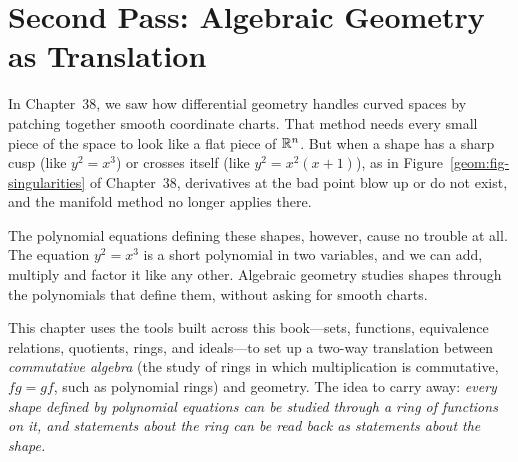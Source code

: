 \section{Second Pass: Algebraic Geometry as Translation}
\chapterline

In Chapter~38, we saw how differential geometry handles curved spaces by patching together smooth coordinate charts. That method needs every small piece of the space to look like a flat piece of $\mathbb{R}^n$. But when a shape has a sharp cusp (like $y^2 = x^3$) or crosses itself (like $y^2 = x^2(x+1)$), as in Figure~\ref{geom:fig-singularities} of Chapter~38, derivatives at the bad point blow up or do not exist, and the manifold method no longer applies there.

The polynomial equations defining these shapes, however, cause no trouble at all. The equation $y^2 = x^3$ is a short polynomial in two variables, and we can add, multiply and factor it like any other. Algebraic geometry studies shapes through the polynomials that define them, without asking for smooth charts.

This chapter uses the tools built across this book---sets, functions, equivalence relations, quotients, rings, and ideals---to set up a two-way translation between \emph{commutative algebra} (the study of rings in which multiplication is commutative, $fg = gf$, such as polynomial rings) and geometry. The idea to carry away: \emph{every shape defined by polynomial equations can be studied through a ring of functions on it, and statements about the ring can be read back as statements about the shape.}

